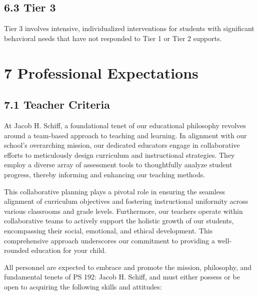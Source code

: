 \documentclass[11pt]{article}
\begin{document}
\subsection{6.3 Tier 3}
\label{sec:orga194511}

Tier 3 involves intensive, individualized interventions for students with significant behavioral needs that have not responded to Tier 1 or Tier 2 supports.

\section{7 Professional Expectations}
\label{sec:orgdf1756a}

\subsection{7.1 Teacher Criteria}
\label{sec:org5922fb3}

At Jacob H. Schiff, a foundational tenet of our educational philosophy revolves around a team-based approach to teaching and learning. In alignment with our school’s overarching mission, our dedicated educators engage in collaborative efforts to meticulously design curriculum and instructional strategies. They employ a diverse array of assessment tools to thoughtfully analyze student progress, thereby informing and enhancing our teaching methods.

This collaborative planning plays a pivotal role in ensuring the seamless alignment of curriculum objectives and fostering instructional uniformity across various classrooms and grade levels. Furthermore, our teachers operate within collaborative teams to actively support the holistic growth of our students, encompassing their social, emotional, and ethical development. This comprehensive approach underscores our commitment to providing a well-rounded education for your child.

All personnel are expected to embrace and promote the mission, philosophy, and fundamental tenets of PS 192: Jacob H. Schiff, and must either possess or be open to acquiring the following skills and attitudes:
\end{document}
